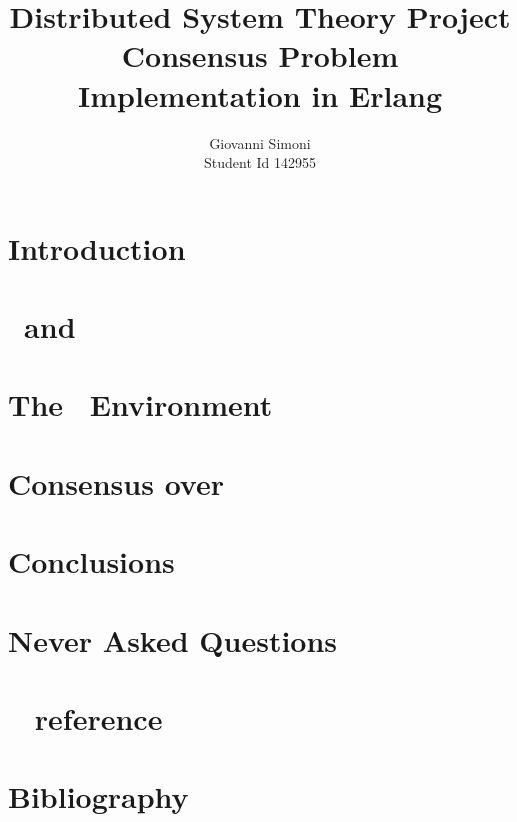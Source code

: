 \documentclass[a4paper]{article}
\title{Distributed System Theory Project \\
       Consensus Problem \\
       Implementation in Erlang}
\author{Giovanni Simoni\\ Student Id 142955}
\begin{document}
    \maketitle
    \newpage

    \tableofcontents
    \newpage

    \section{Introduction} \label{sec:Introduction}
    

    \section{\Erlang\ and \OTP} \label{sec:erlang-and-otp}
    

    \section{The \YUNA\ Environment} \label{sec:the-yuna-environment}
    

    \section{Consensus over \YUNA}
    

    \section{Conclusions}
    

    \section{Never Asked Questions}
    


    \section{\YUNA\  reference} \label{sec:yuna-api-reference}
    

    \section{Bibliography}
    
\end{document}
